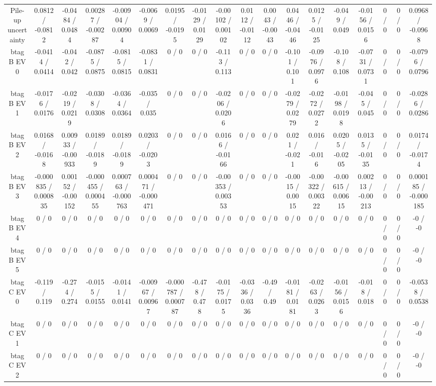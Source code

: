 \documentclass[10pt]{article}
\begin{document}
\begin{table}[htbp]
\begin{center}
\begin{tabular}{|c|c|c|c|c|c|c|c|c|c|c|c|c|c|c|c|c|c|}
  Pile-up uncertainty & 0.0812 / -0.0812 & -0.0484 / 0.0484 & 0.00287 / -0.00287 & -0.00904 / 0.00904 & -0.0069 / 0.0069 & 0.0195 / -0.0195 & -0.0129 / 0.0129 & -0.00102 / 0.00102 & 0.0112 / -0.0112 & 0.0043 / -0.0043 & 0.0446 / -0.0446 & 0.0125 / -0.0125 & -0.049 / 0.049 & -0.0156 / 0.0156 & 0 / 0 & 0 / 0 & 0.0968 / -0.0968 \\ 
  btag B EV 0 & -0.0414 / 0.0414 & -0.042 / 0.042 & -0.0875 / 0.0875 & -0.0815 / 0.0815 & -0.0831 / 0.0831 & 0 / 0 & 0 / 0 & -0.113 / 0.113 & 0 / 0 & 0 / 0 & -0.101 / 0.101 & -0.0976 / 0.0976 & -0.108 / 0.108 & -0.0731 / 0.0731 & 0 / 0 & 0 / 0 & -0.0796 / 0.0796 \\ 
  btag B EV 1 & -0.0176 / 0.0176 & -0.0219 / 0.0219 & -0.0308 / 0.0308 & -0.0364 / 0.0364 & -0.035 / 0.035 & 0 / 0 & 0 / 0 & -0.0206 / 0.0206 & 0 / 0 & 0 / 0 & -0.0279 / 0.0279 & -0.0272 / 0.0272 & -0.0198 / 0.0198 & -0.045 / 0.045 & 0 / 0 & 0 / 0 & -0.0286 / 0.0286 \\ 
  btag B EV 2 & 0.0168 / -0.0168 & 0.00933 / -0.00933 & 0.0189 / -0.0189 & 0.0189 / -0.0189 & 0.0203 / -0.0203 & 0 / 0 & 0 / 0 & 0.0166 / -0.0166 & 0 / 0 & 0 / 0 & 0.021 / -0.021 & 0.016 / -0.016 & 0.0205 / -0.0205 & 0.0135 / -0.0135 & 0 / 0 & 0 / 0 & 0.0174 / -0.0174 \\ 
  btag B EV 3 & -0.000835 / 0.000835 & 0.00152 / -0.00152 & -0.000455 / 0.000455 & 0.000763 / -0.000763 & 0.000471 / -0.000471 & 0 / 0 & 0 / 0 & -0.00353 / 0.00353 & 0 / 0 & 0 / 0 & -0.0015 / 0.0015 & -0.00322 / 0.00322 & -0.00615 / 0.00615 & 0.00213 / -0.00213 & 0 / 0 & 0 / 0 & 0.000185 / -0.000185 \\ 
  btag B EV 4 & 0 / 0 & 0 / 0 & 0 / 0 & 0 / 0 & 0 / 0 & 0 / 0 & 0 / 0 & 0 / 0 & 0 / 0 & 0 / 0 & 0 / 0 & 0 / 0 & 0 / 0 & 0 / 0 & 0 / 0 & 0 / 0 & -0 / -0 \\ 
  btag B EV 5 & 0 / 0 & 0 / 0 & 0 / 0 & 0 / 0 & 0 / 0 & 0 / 0 & 0 / 0 & 0 / 0 & 0 / 0 & 0 / 0 & 0 / 0 & 0 / 0 & 0 / 0 & 0 / 0 & 0 / 0 & 0 / 0 & -0 / -0 \\ 
  btag C EV 0 & -0.119 / 0.119 & -0.274 / 0.274 & -0.0155 / 0.0155 & -0.0141 / 0.0141 & -0.00967 / 0.00967 & -0.000787 / 0.000787 & -0.478 / 0.478 & -0.0175 / 0.0175 & -0.0336 / 0.0336 & -0.49 / 0.49 & -0.0181 / 0.0181 & -0.0263 / 0.0263 & -0.0156 / 0.0156 & -0.018 / 0.018 & 0 / 0 & 0 / 0 & -0.0538 / 0.0538 \\ 
  btag C EV 1 & 0 / 0 & 0 / 0 & 0 / 0 & 0 / 0 & 0 / 0 & 0 / 0 & 0 / 0 & 0 / 0 & 0 / 0 & 0 / 0 & 0 / 0 & 0 / 0 & 0 / 0 & 0 / 0 & 0 / 0 & 0 / 0 & -0 / -0 \\ 
  btag C EV 2 & 0 / 0 & 0 / 0 & 0 / 0 & 0 / 0 & 0 / 0 & 0 / 0 & 0 / 0 & 0 / 0 & 0 / 0 & 0 / 0 & 0 / 0 & 0 / 0 & 0 / 0 & 0 / 0 & 0 / 0 & 0 / 0 & -0 / -0 \\ 

\end{tabular}
\end{center}
\end{table}
\end{document}
